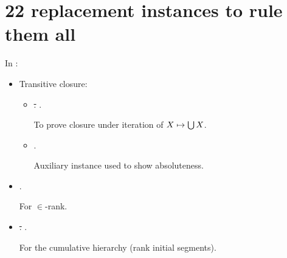 \section{22 replacement instances to rule them all}
\label{sec:repl-instances-appendix}

In :

\begin{itemize}
\item Transitive closure:
  \begin{itemize}
  \item
    \sout{.} .

    To prove closure under iteration of $X\mapsto\mathop{\textstyle\bigcup} X$.
  \item
    \sout{} .

    Auxiliary instance used to show absoluteness.
  \end{itemize}
\item {}.
  
  For $\in$-rank.
\item \sout{.} .

  For the cumulative hierarchy (rank initial segments).
\end{itemize}

